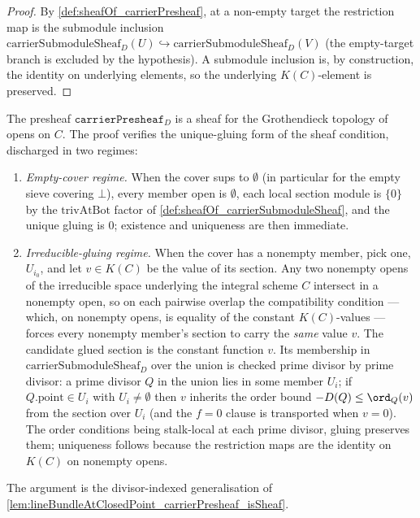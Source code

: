 \begin{proof}
  \leanok
  By \cref{def:sheafOf_carrierPresheaf}, at a non-empty target the restriction
  map is the submodule inclusion
  \(\mathrm{carrierSubmoduleSheaf}_D(U) \hookrightarrow
  \mathrm{carrierSubmoduleSheaf}_D(V)\) (the empty-target branch is excluded by
  the hypothesis). A submodule inclusion is, by construction, the identity on
  underlying elements, so the underlying \(K(C)\)-element is preserved.
\end{proof}

\begin{lemma}

  \label{lem:sheafOf_carrierPresheaf_isSheaf}
  The presheaf \(\texttt{carrierPresheaf}_D\) is a sheaf for the
  Grothendieck topology of opens on \(C\). The proof verifies the
  unique-gluing form of the sheaf condition, discharged in two
  regimes:
  \begin{enumerate}
    \item \emph{Empty-cover regime.} When the cover sups to \(\emptyset\)
      (in particular for the empty sieve covering \(\bot\)), every member
      open is \(\emptyset\), each local section module is \(\{0\}\) by the
      \(\mathrm{trivAtBot}\) factor of
      \cref{def:sheafOf_carrierSubmoduleSheaf}, and the unique gluing is
      \(0\); existence and uniqueness are then immediate.
    \item \emph{Irreducible-gluing regime.} When the cover has a nonempty
      member, pick one, \(U_{i_0}\), and let \(v \in K(C)\) be the value of
      its section. Any two nonempty opens of the irreducible space
      underlying the integral scheme \(C\) intersect in a nonempty open, so
      on each pairwise overlap the compatibility condition — which, on
      nonempty opens, is equality of the constant \(K(C)\)-values — forces
      every nonempty member's section to carry the \emph{same} value \(v\).
      The candidate glued section is the constant function \(v\). Its
      membership in \(\mathrm{carrierSubmoduleSheaf}_D\) over the union is
      checked prime divisor by prime divisor: a prime divisor \(Q\) in the
      union lies in some member \(U_i\); if \(Q.\mathrm{point} \in U_i\)
      with \(U_i \ne \emptyset\) then \(v\) inherits the order bound
      \(-D(Q) \le \ord_Q(v)\) from the section over \(U_i\) (and the
      \(f = 0\) clause is transported when \(v = 0\)). The order conditions
      being stalk-local at each prime divisor, gluing preserves them;
      uniqueness follows because the restriction maps are the identity on
      \(K(C)\) on nonempty opens.
  \end{enumerate}
  The argument is the divisor-indexed generalisation of
  \cref{lem:lineBundleAtClosedPoint_carrierPresheaf_isSheaf}.
\end{lemma}

